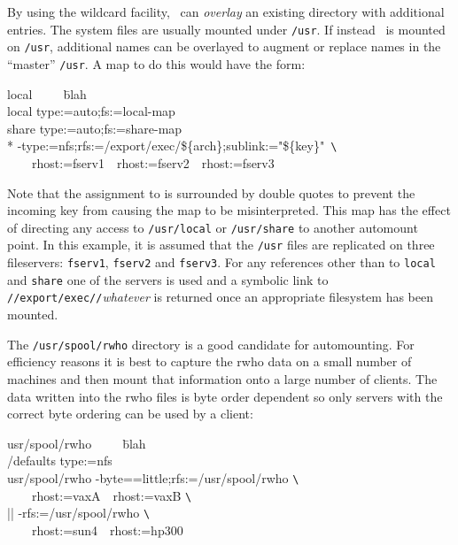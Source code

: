 By using the wildcard facility, \amd\ can {\em overlay} an existing
directory with additional entries.
The system files are usually mounted under {\tt /usr}.  If instead
\amd\ is mounted on {\tt /usr}, additional
names can be overlayed to augment or replace names in the ``master'' {\tt /usr}.
A map to do this would have the form:
{\tt\begin{tabbing}
local\ \ \ \ \ \= blah \kill \\
local          \> type:=auto;fs:=local-map\\
share          \> type:=auto;fs:=share-map\\
{}*            \> -type:=nfs;rfs:=/export/exec/\$\{arch\};sublink:="\$\{key\}"\ \verb+\+\\
               \> \ \ \ \ rhost:=fserv1\ \ rhost:=fserv2\ \ rhost:=fserv3 \\
\end{tabbing}}
Note that the assignment to  is surrounded by double quotes to
prevent the incoming key from causing the map to be misinterpreted.
This map has the effect of directing any access to {\tt /usr/local} or {\tt /usr/share}
to another automount point.
In this example, it is assumed that the {\tt /usr} files are replicated on
three fileservers: {\tt fserv1}, {\tt fserv2} and {\tt fserv3}.
For any references other than to {\tt local}
and {\tt share} one of the servers is used and a symbolic link to
{\tt {}//export/exec//}{\em whatever}
is returned once an appropriate filesystem has been mounted.


The {\tt /usr/spool/rwho} directory is a good candidate for automounting.
For efficiency reasons it is best to capture the rwho data on a small
number of machines and then mount that information onto a large number
of clients.  The data written into the rwho files is byte order dependent
so only servers with the correct byte ordering can be used by a client:
{\tt\begin{tabbing}
usr/spool/rwho\ \ \ \ \ \= blah \kill \\
/defaults               \> type:=nfs \\
usr/spool/rwho          \> -byte==little;rfs:=/usr/spool/rwho \verb+\+\\
                        \>\ \ \ \ rhost:=vaxA\ \ rhost:=vaxB \verb+\+\\
                        \>|| -rfs:=/usr/spool/rwho \verb+\+\\
                        \>\ \ \ \ rhost:=sun4\ \ rhost:=hp300\\
\end{tabbing}}

